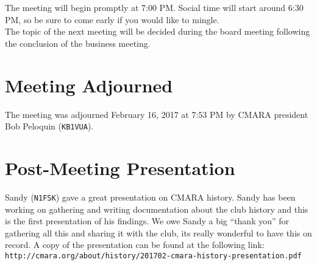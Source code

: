 \documentclass[10pt,letterpaper]{article}
\begin{document}
\noindent
The meeting will begin promptly at 7:00 PM. Social time will start around 6:30 PM, so be sure to come early if you would like to mingle.\\

\noindent
The topic of the next meeting will be decided during the board meeting following the conclusion of the business meeting.

\section{Meeting Adjourned}
The meeting was adjourned February 16, 2017 at 7:53 PM by CMARA president Bob Peloquin (\texttt{KB1VUA}).

\section{Post-Meeting Presentation}
Sandy (\texttt{N1FSK}) gave a great presentation on CMARA history. Sandy has been working on gathering and writing documentation about the club history and this is the first presentation of his findings. We owe Sandy a big ``thank you'' for gathering all this and sharing it with the club, its really wonderful to have this on record. A copy of the presentation can be found at the following link:\\

\noindent
\texttt{http://cmara.org/about/history/201702-cmara-history-presentation.pdf}
\end{document}

